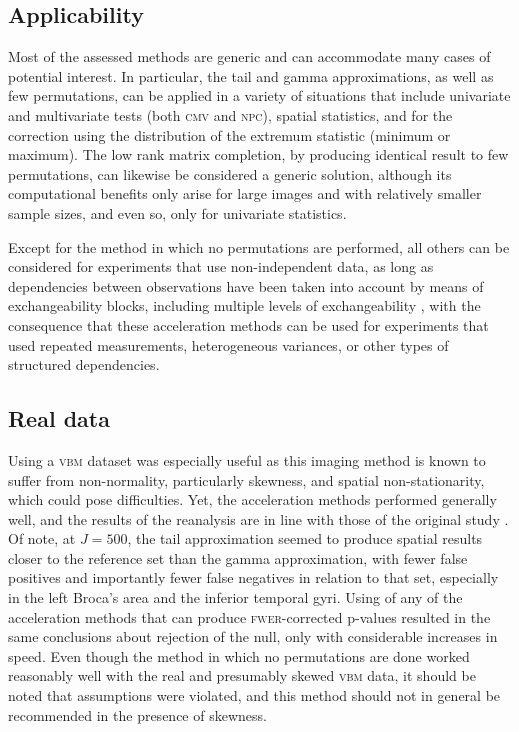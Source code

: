 \subsection{Applicability}

Most of the assessed methods are generic and can accommodate many cases of potential interest. In particular, the tail and gamma approximations, as well as few permutations, can be applied in a variety of situations that include univariate and multivariate tests (both \textsc{cmv} and \textsc{npc}), spatial statistics, and for the correction using the distribution of the extremum statistic (minimum or maximum). The low rank matrix completion, by producing identical result to few permutations, can likewise be considered a generic solution, although its computational benefits only arise for large images and with relatively smaller sample sizes, and even so, only for univariate statistics.

Except for the method in which no permutations are performed, all others can be considered for experiments that use non-independent data, as long as dependencies between observations have been taken into account by means of exchangeability blocks, including multiple levels of exchangeability \citep{Winkler2015}, with the consequence that these acceleration methods can be used for experiments that used repeated measurements, heterogeneous variances, or other types of structured dependencies.

\subsection{Real data}

Using a \textsc{vbm} dataset was especially useful as this imaging method is known to suffer from non-normality, particularly skewness, and spatial non-stationarity, which could pose difficulties. Yet, the acceleration methods performed generally well, and the results of the reanalysis are in line with those of the original study \citep{Douaud2007}. Of note, at $J=500$, the tail approximation seemed to produce spatial results closer to the reference set than the gamma approximation, with fewer false positives and importantly fewer false negatives in relation to that set, especially in the left Broca's area and the inferior temporal gyri. Using of any of the acceleration methods that can produce \textsc{fwer}-corrected p-values resulted in the same conclusions about rejection of the null, only with considerable increases in speed. Even though the method in which no permutations are done worked reasonably well with the real and presumably skewed \textsc{vbm} data, it should be noted that assumptions were violated, and this method should not in general be recommended in the presence of skewness.

